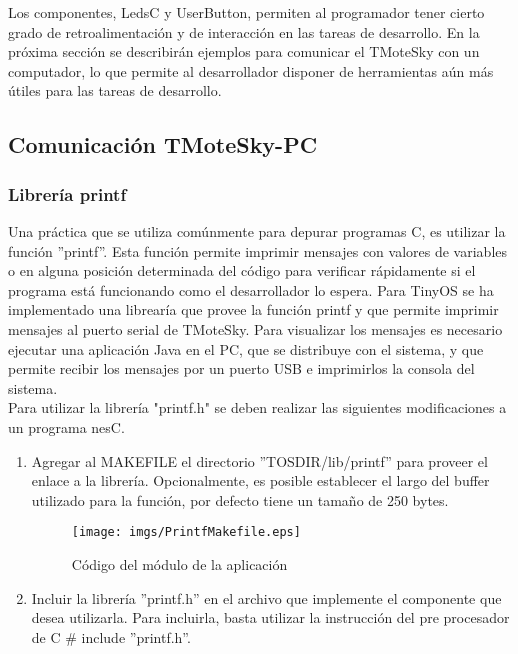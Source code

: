 Los componentes, LedsC y UserButton, permiten al programador tener cierto grado de retroalimentación y de interacción en las tareas de desarrollo. En la próxima sección se describirán ejemplos para comunicar el TMoteSky con un computador, lo que permite al desarrollador disponer de herramientas aún más útiles para las tareas de desarrollo.
\subsection{Comunicación TMoteSky-PC}

\subsubsection{Librería printf}
Una práctica que se utiliza comúnmente para depurar programas C, es utilizar la función ''printf''. Esta función permite imprimir mensajes con valores de variables o en alguna posición determinada del código para verificar rápidamente si el programa está funcionando como el desarrollador lo espera. Para TinyOS se ha implementado una librearía que provee la función printf y que permite imprimir mensajes al puerto serial de TMoteSky. Para visualizar los mensajes es necesario ejecutar una aplicación Java en el PC, que se distribuye con el sistema, y que permite recibir los mensajes por un puerto USB e imprimirlos la consola del sistema.\\

Para utilizar la librería "printf.h" se deben realizar las siguientes modificaciones a un programa nesC.

\begin{enumerate}
\item Agregar al MAKEFILE el directorio ''TOSDIR/lib/printf'' para proveer el enlace a la librería. Opcionalmente, es posible establecer el largo del buffer utilizado para la función, por defecto tiene un tamaño de 250 bytes.

\begin{figure}[H]
	\centering
 	\texttt{[image: imgs/PrintfMakefile.eps]} 
 	\caption{Código del módulo de la aplicación}
\end{figure}

\item Incluir la librería ''printf.h'' en el archivo que implemente el componente que desea utilizarla. Para incluirla, basta utilizar la instrucción del pre procesador de C \# include ''printf.h''.
\end{enumerate}

